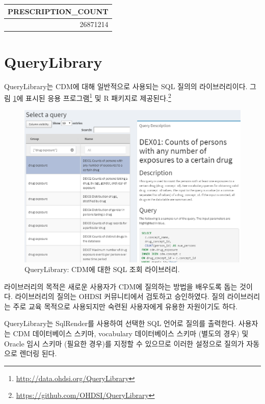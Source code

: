 \documentclass[10.5pt]{book}
\let\rmarkdownfootnote\footnote%
\def\footnote{\protect\rmarkdownfootnote}
\theoremstyle{definition}
\theoremstyle{definition}
\theoremstyle{definition}
\theoremstyle{remark}
\begin{document}
\begin{longtable}[]{@{}r@{}}
\toprule
PRESCRIPTION\_COUNT\tabularnewline
\midrule
\endhead
26871214\tabularnewline
\bottomrule
\end{longtable}

\section{QueryLibrary}\label{querylibrary}


QueryLibrary는 CDM에 대해 일반적으로 사용되는 SQL 질의의 라이브러리이다.
그림 \ref{fig:queryLibrary}에 표시된 응용 프로그램\footnote{\url{http://data.ohdsi.org/QueryLibrary}}
및 R 패키지로 제공된다.\footnote{\url{https://github.com/OHDSI/QueryLibrary}}

\begin{figure}

{\centering \includegraphics[width=1\linewidth]{images/SqlAndR/queryLibrary} 

}

\caption{QueryLibrary: CDM에 대한 SQL 조회 라이브러리.}\label{fig:queryLibrary}
\end{figure}

라이브러리의 목적은 새로운 사용자가 CDM에 질의하는 방법을 배우도록 돕는
것이다. 라이브러리의 질의는 OHDSI 커뮤니티에서 검토하고 승인하였다. 질의
라이브러리는 주로 교육 목적으로 사용되지만 숙련된 사용자에게 유용한
자원이기도 하다.

QueryLibrary는 SqlRender를 사용하여 선택한 SQL 언어로 질의를 출력한다.
사용자는 CDM 데이터베이스 스키마, vocabulary 데이터베이스 스키마 (별도의
경우) 및 Oracle 임시 스키마 (필요한 경우)를 지정할 수 있으므로 이러한
설정으로 질의가 자동으로 렌더링 된다.
\end{document}
